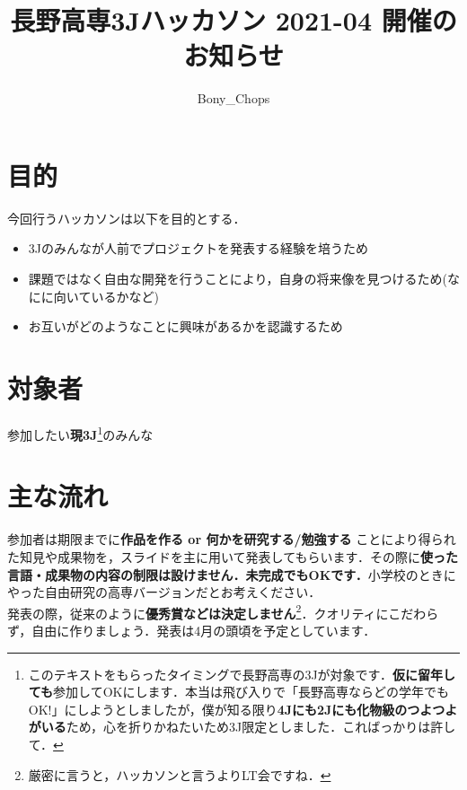 \documentclass[a4j]{jarticle}
\title{長野高専3Jハッカソン 2021-04 開催のお知らせ}
\author{Bony\_Chops}
\begin{document}
\maketitle

\section{目的}
今回行うハッカソンは以下を目的とする．
\begin{itemize}
\item 3Jのみんなが人前でプロジェクトを発表する経験を培うため
\item 課題ではなく自由な開発を行うことにより，自身の将来像を見つけるため(なにに向いているかなど)
\item お互いがどのようなことに興味があるかを認識するため
\end{itemize}
\section{対象者}
参加したい\textbf{現3J}\footnote{このテキストをもらったタイミングで長野高専の3Jが対象です．\textbf{仮に留年しても}参加してOKにします．本当は飛び入りで「長野高専ならどの学年でもOK!」にしようとしましたが，僕が知る限り\textbf{4Jにも2Jにも化物級のつよつよがいる}ため，心を折りかねたいため3J限定としました．こればっかりは許して．}のみんな

\section{主な流れ}
参加者は期限までに\textbf{作品を作る or 何かを研究する/勉強する} ことにより得られた知見や成果物を，スライドを主に用いて発表してもらいます．その際に\textbf{使った言語・成果物の内容の制限は設けません．未完成でもOKです．}小学校のときにやった自由研究の高専バージョンだとお考えください．\\
\quad 発表の際，従来のように\textbf{優秀賞などは決定しません}\footnote{厳密に言うと，ハッカソンと言うよりLT会ですね．}．クオリティにこだわらず，自由に作りましょう．発表は4月の頭頃を予定としています．
\end{document}
